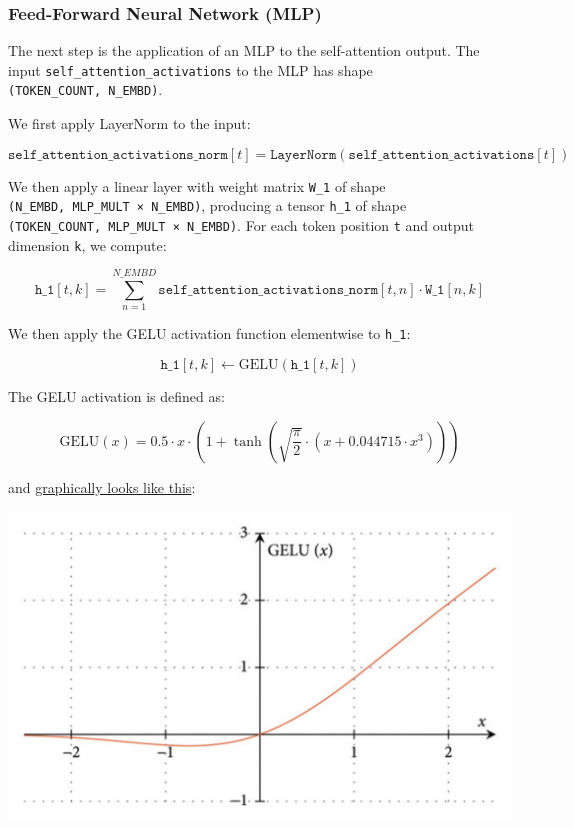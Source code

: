 \documentclass[11pt]{article}
\begin{document}
    \subsubsection{Feed-Forward Neural Network
(MLP)}\label{feed-forward-neural-network-mlp}

The next step is the application of an MLP to the self-attention output.
The input \texttt{self\_attention\_activations} to the MLP has shape
\texttt{(TOKEN\_COUNT,\ N\_EMBD)}.

We first apply LayerNorm to the input:

\[
\texttt{self\_attention\_activations\_norm}[t] = \texttt{LayerNorm}(\texttt{self\_attention\_activations}[t])
\]

We then apply a linear layer with weight matrix \texttt{W\_1} of shape
\texttt{(N\_EMBD,\ MLP\_MULT\ ×\ N\_EMBD)}, producing a tensor
\texttt{h\_1} of shape \texttt{(TOKEN\_COUNT,\ MLP\_MULT\ ×\ N\_EMBD)}.
For each token position \texttt{t} and output dimension \texttt{k}, we
compute:

\[
\texttt{h\_1}[t, k] = \sum_{n=1}^{N\_EMBD} \texttt{self\_attention\_activations\_norm}[t, n] \cdot \texttt{W\_1}[n, k]
\]

We then apply the GELU activation function elementwise to \texttt{h\_1}:

\[
\texttt{h\_1}[t, k] \leftarrow \text{GELU}(\texttt{h\_1}[t, k])
\]

The GELU activation is defined as:

\[
\text{GELU}(x) = 0.5 \cdot x \cdot \left(1 + \tanh\left(\sqrt{\frac{\pi}{2}} \cdot \left(x + 0.044715 \cdot x^3\right)\right)\right)
\]

and
\href{https://onlinelibrary.wiley.com/doi/10.1155/2023/4229924}{graphically
looks like this}:

\begin{center}
\includegraphics[keepaspectratio]{inserted_images/gelu_graph.png}
\end{center}
\end{document}

